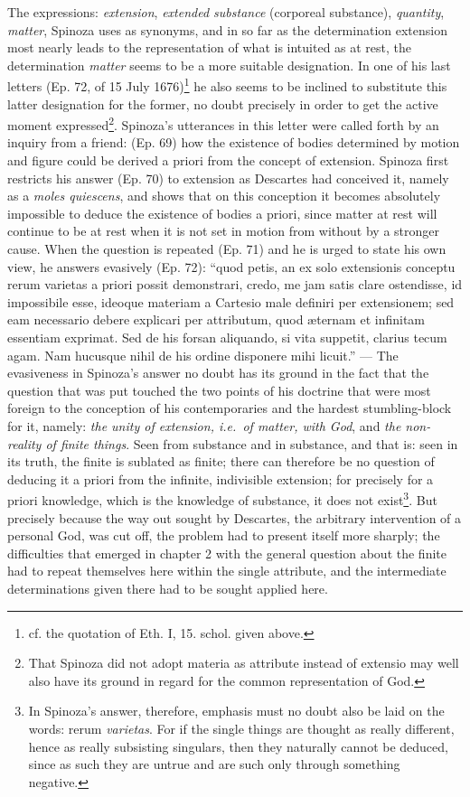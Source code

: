 \documentclass[12pt,a4paper,openany]{book}
\newcommand{\opage}[1]{\marginnote{\footnotesize\textit{[#1]}}}
\begin{document}
The expressions: \emph{extension}, \emph{extended substance} (corporeal
substance), \emph{quantity}, \emph{matter}, Spinoza uses as
synonyms, and in so far as the determination extension most nearly
leads to the representation of what is intuited as at rest,
the determination \emph{matter} seems to be a more suitable designation. In
one of his last letters (Ep. 72, of 15 July 1676)\footnote{cf.
the quotation of Eth. I, 15. schol. given above.} he also seems
to be inclined to substitute this latter designation for
the former, no doubt precisely in order to get the active moment
expressed\footnote{That Spinoza did not adopt materia as attribute
instead of extensio may well also have its ground in regard for
the common representation of God.}. Spinoza's utterances
\opage{77}\setcounter{footnote}{0}in this letter were called forth by an inquiry from a friend: (Ep.
69) how the existence of bodies determined by motion and figure
could be derived a priori from the concept of extension.
Spinoza first restricts his answer (Ep. 70) to extension
as Descartes had conceived it, namely as a \emph{moles
quiescens}, and shows that on this conception it becomes absolutely
impossible to deduce the existence of bodies a priori, since
matter at rest will continue to be at rest when it is not
set in motion from without by a stronger cause. When
the question is repeated (Ep. 71) and he is urged to state
his own view, he answers evasively (Ep. 72):
``quod petis, %
an ex solo extensionis conceptu rerum varietas a priori possit
demonstrari, credo, me jam satis clare ostendisse, id impossibile
esse, ideoque materiam a Cartesio male definiri per extensionem;
sed eam necessario debere explicari per attributum, quod æternam
et infinitam essentiam exprimat. Sed de his forsan aliquando, si
vita suppetit, clarius tecum agam. Nam hucusque nihil de his
ordine disponere mihi licuit.'' --- The evasiveness in Spinoza's answer
no doubt has its ground in the fact that the question that was put touched
the two points of his doctrine that were most foreign to the conception of
his contemporaries and the hardest stumbling-block for it, namely:
\emph{the unity of extension, i.e.\ of matter, with God}, and \emph{the non-reality of
finite things}. Seen from substance and in substance, and
that is: seen in its truth, the finite is sublated as finite;
there can therefore be no question of deducing it a priori from the
infinite, indivisible extension; for precisely for a priori
knowledge, which is the knowledge of substance, it does
not exist\footnote{In Spinoza's answer, therefore, emphasis must no doubt also be laid
on the words: rerum \emph{varietas}. For if the single
things are thought as really different, hence as really subsisting
singulars, then they naturally cannot be deduced, since as
such they are untrue and are such only through something negative.}. But
\opage{78}\setcounter{footnote}{0}precisely because the way out sought by Descartes, the arbitrary
intervention of a personal God, was cut off, the problem had to
present itself more sharply; the difficulties that emerged in chapter 2 with the
general question about the finite had to repeat themselves here
within the single attribute, and the intermediate determinations
given there had to be sought applied here.
\end{document}
